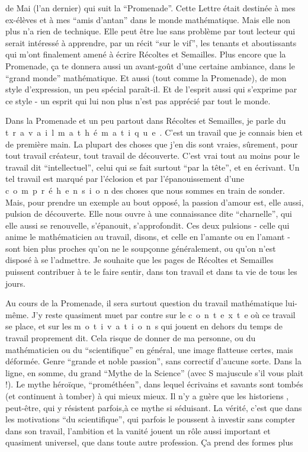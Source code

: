 \noindent de Mai  (l'an dernier) qui suit la ``Promenade''. Cette Lettre était destinée à mes ex-élèves et à mes ``amis d'antan'' dans le monde mathématique. Mais elle non plus n'a rien de technique. Elle peut être lue sans problème par tout lecteur qui serait intéressé à apprendre, par un récit ``sur le vif'', les tenants et aboutissants qui m'ont finalement amené à écrire Récoltes et Semailles. Plus encore que la Promenade, ça te donnera aussi un avant-goût d'une certaine ambiance, dans le ``grand monde'' mathématique. Et aussi (tout comme la Promenade), de mon style d'expression, un peu spécial paraît-il. Et de l'esprit aussi qui s'exprime par ce style - un esprit qui lui non plus n'est pas apprécié par tout le monde.

Dans la Promenade et un peu partout dans Récoltes et Semailles, je parle du \mbox{t r a v a i l \quad m a t h é m a t i q u e .} C'est un travail que je connais bien et de première main. La plupart des choses que j'en dis sont vraies, sûrement, pour tout travail créateur, tout travail de découverte. C'est vrai tout au moins pour le travail dit ``intellectuel'', celui qui se fait surtout ``par la tête'', et en écrivant. Un tel travail est marqué par l'éclosion et par l'épanouissement d'une \mbox{c o m p r é h e n s i o n} des choses que nous sommes en train de sonder. Mais, pour prendre un exemple au bout opposé, la passion d'amour est, elle aussi, pulsion de découverte. Elle nous ouvre à une connaissance dite ``charnelle'', qui elle aussi se renouvelle, s'épanouit, s'approfondit. Ces deux pulsions - celle qui anime le mathématicien au travail, disons, et celle en l'amante ou en l'amant - sont bien plus proches qu'on ne le soupçonne généralement, ou qu'on n'est disposé à se l'admettre. Je souhaite que les pages de Récoltes et Semailles puissent contribuer à te le faire sentir, dans ton travail et dans ta vie de tous les jours.

Au cours de la Promenade, il sera surtout question du travail mathématique lui-même. J'y reste quasiment muet par contre sur le \mbox{c o n t e x t e} où ce travail se place, et sur les \mbox{m o t i v a t i o n s} qui jouent en dehors du temps de travail proprement dit. Cela risque de donner de ma personne, ou du mathématicien ou du ``scientifique'' en général, une image flatteuse certes, mais déformée. Genre ``grande et noble passion'', sans correctif d'aucune sorte. Dans la ligne, en somme, du grand ``Mythe de la Science'' (avec S majuscule s'il vous plait !). Le mythe héroïque, ``prométhéen'', dans lequel écrivains et savants sont tombés (et continuent à tomber) à qui mieux mieux. Il n'y a guère que les historiens , peut-être, qui y résistent parfois,à ce mythe si séduisant. La vérité, c'est que dans les motivations ``du scientifique'', qui parfois le poussent à investir sans compter dans son travail, l'ambition et la vanité jouent un rôle aussi important et quasiment universel, que dans toute autre profession. Ça prend des formes plus

